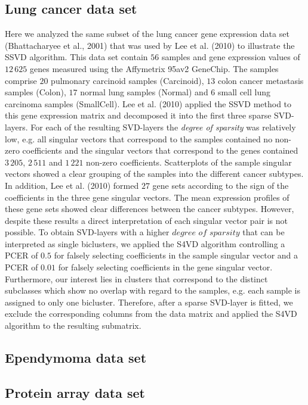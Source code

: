 \subsection{Lung cancer data set}
Here we analyzed the same subset of the lung cancer gene expression data set (Bhattacharyee et al., 2001) that was used by Lee et al. (2010) to illustrate the SSVD algorithm. This data set contain $56$ samples and gene expression values of $12\,625$ genes measured using the Affymetrix 95av2 GeneChip. The samples comprise $20$ pulmonary carcinoid samples (Carcinoid), $13$ colon cancer metastasis samples (Colon), $17$ normal lung samples (Normal) and $6$ small cell lung carcinoma samples (SmallCell). Lee et al. (2010) applied the SSVD method to this gene expression matrix and decomposed it into the first three sparse SVD-layers. For each of the resulting SVD-layers the \textit{degree of sparsity} was relatively low, e.g. all singular vectors that correspond to the samples contained no non-zero coefficients and the singular vectors that correspond to the genes contained $3\,205$, $2\,511$ and $1\,221$ non-zero coefficients. Scatterplots of the sample singular vectors showed a clear grouping of the samples into the different cancer subtypes. In addition, Lee et al. (2010) formed $27$ gene sets according to the sign of the coefficients in the three gene singular vectors. The mean expression profiles of these gene sets showed clear differences between the cancer subtypes. However, despite these results a direct interpretation of each singular vector pair is not possible. 
To obtain SVD-layers with a higher $\textit{degree of sparsity}$ that can be interpreted as single biclusters, we applied the S4VD algorithm controlling a PCER of $0.5$ for falsely selecting coefficients in the sample singular vector and a PCER of $0.01$ for falsely selecting coefficients in the gene singular vector. Furthermore, our interest lies in clusters that correspond to the distinct subclasses which show no overlap with regard to the samples, e.g. each sample is assigned to only one bicluster. Therefore, after a sparse SVD-layer is fitted, we exclude the corresponding columns from the data matrix and applied the S4VD algorithm to the resulting submatrix.
\subsection{Ependymoma data set}
\subsection{Protein array data set}
